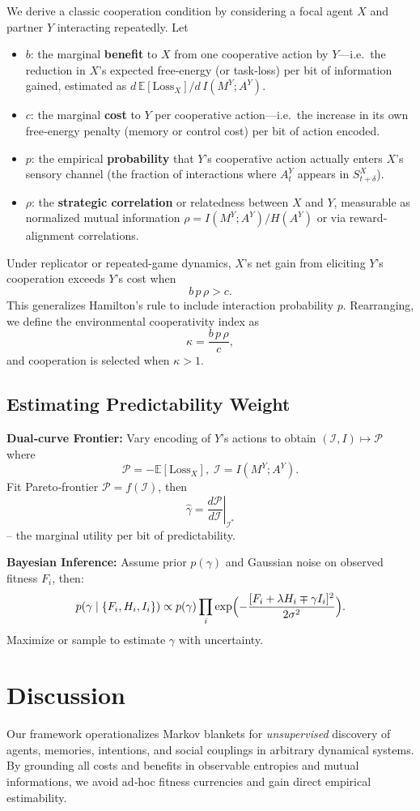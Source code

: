 \documentclass[10pt,conference]{IEEEtran}
\begin{document}
We derive a classic cooperation condition by considering a focal agent $X$ and partner $Y$ interacting repeatedly.  Let
\begin{itemize}
  \item \(b\): the marginal \textbf{benefit} to \(X\) from one cooperative action by \(Y\)—i.e.\ the reduction in \(X\)'s expected free‐energy (or task‐loss) per bit of information gained, estimated as \(d\,\mathbb{E}[\mathrm{Loss}_X]/d\,I(M^Y;A^Y)\).
  \item \(c\): the marginal \textbf{cost} to \(Y\) per cooperative action—i.e.\ the increase in its own free‐energy penalty (memory or control cost) per bit of action encoded.
  \item \(p\): the empirical \textbf{probability} that \(Y\)'s cooperative action actually enters \(X\)'s sensory channel (the fraction of interactions where \(A^Y_t\) appears in \(S^X_{t+\delta}\)).
  \item \(\rho\): the \textbf{strategic correlation} or relatedness between \(X\) and \(Y\), measurable as normalized mutual information \(\rho=I(M^Y;A^Y)/H(A^Y)\) or via reward‐alignment correlations.
\end{itemize}
Under replicator or repeated-game dynamics, $X$'s net gain from eliciting $Y$'s cooperation exceeds $Y$'s cost when
\[
b\,p\,\rho > c.
\]
This generalizes Hamilton's rule \cite{Hamilton1964} to include interaction probability $p$. Rearranging, we define the environmental cooperativity index as
\[
\kappa = \frac{b\,p\,\rho}{c},
\]
and cooperation is selected when $\kappa>1$.

\subsection{Estimating Predictability Weight}
\textbf{Dual‐curve Frontier:} Vary encoding of $Y$'s actions to obtain $(\mathcal I,I)\mapsto\mathcal P$ where
\[\mathcal P=-\mathbb{E}[\mathrm{Loss}_X],\;\mathcal I=I(M^Y;A^Y).\]
Fit Pareto‐frontier $\mathcal P=f(\mathcal I)$, then
\[
\hat\gamma=\left.\frac{d\mathcal P}{d\mathcal I}\right|_{\mathcal I^*}
\]
-- the marginal utility per bit of predictability.  

\textbf{Bayesian Inference:} Assume prior $p(\gamma)$ and Gaussian noise on observed fitness $F_i$, then:
\[
 p(\gamma\mid\{F_i,H_i,I_i\})\propto p(\gamma)\prod_i\exp\Bigl(-\frac{[F_i+\lambda H_i\mp\gamma I_i]^2}{2\sigma^2}\Bigr).
\]
Maximize or sample to estimate $\gamma$ with uncertainty.


\section{Discussion}
Our framework operationalizes Markov blankets for \emph{unsupervised} discovery of agents, memories, intentions, and social couplings in arbitrary dynamical systems.  By grounding all costs and benefits in observable entropies and mutual informations, we avoid ad‐hoc fitness currencies and gain direct empirical estimability.
\end{document}
